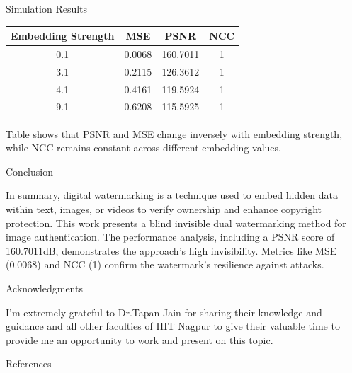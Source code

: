 \documentclass[final]{beamer}
\newlength{\colwidth}
\begin{document}
\begin{frame}[t]
\begin{columns}[t]
\begin{column}{\colwidth}
\begin{block}{Simulation Results}
\begin{table}[]
\begin{tabular}{@{}|cl|c|c|c|@{}}
\toprule
\multicolumn{2}{|c|}{\textbf{Embedding   Strength}} & \textbf{MSE} & \textbf{PSNR} & \textbf{NCC} \\ \midrule
\multicolumn{2}{|c|}{0.1}                           & 0.0068       & 160.7011      & 1            \\ \midrule
\multicolumn{2}{|c|}{3.1}                           & 0.2115       & 126.3612      & 1            \\ \midrule
\multicolumn{2}{|c|}{4.1}                           & 0.4161       & 119.5924      & 1            \\ \midrule
\multicolumn{2}{|c|}{9.1}                           & 0.6208       & 115.5925      & 1            \\ \bottomrule
\end{tabular}
\end{table}

Table shows that PSNR and MSE change inversely with embedding strength, while NCC remains constant across different embedding values.

\end{block}

\begin{block}{Conclusion}

   In summary, digital watermarking is a technique used to embed hidden data within text, images, or videos to verify ownership and enhance copyright protection. This work presents a blind invisible dual watermarking method for image authentication. The performance analysis, including a PSNR score of 160.7011dB, demonstrates the approach's high invisibility. Metrics like MSE (0.0068) and NCC (1) confirm the watermark's resilience against attacks.

\end{block}

\begin{block}{Acknowledgments}

   I'm extremely grateful to Dr.Tapan Jain for sharing their knowledge and guidance and all other faculties of IIIT Nagpur to give their valuable time to provide me an opportunity to work and present on this topic.

\end{block}

\begin{block}{References}


\end{block}
\end{column}
\end{columns}
\end{frame}
\end{document}
